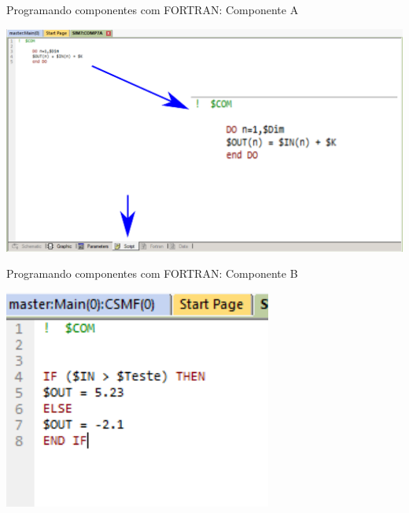 \begin{frame}{Programando componentes com FORTRAN: Componente A}
\centering

\includegraphics[width=0.75\linewidth]{./figuras/Componentes/FortranA_script}

\end{frame}




\begin{frame}{Programando componentes com FORTRAN: Componente B}
\centering

\includegraphics[width=0.45\linewidth]{./figuras/Componentes/FortranB_script}

\end{frame}






